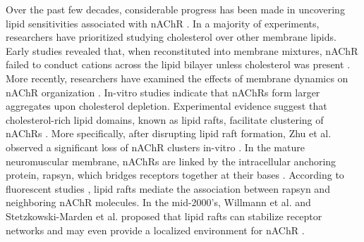 Over the past few decades, considerable progress has been made in uncovering lipid sensitivities associated with nAChR \citep{Criado1982}. In a majority of experiments, researchers have prioritized studying cholesterol over other membrane lipids. Early studies revealed that, when reconstituted into membrane mixtures, nAChR failed to conduct cations across the lipid bilayer unless cholesterol was present  \citep{Fong_Correlation_1986,Sunshine_Lipid_1992,Butler1993,Fong_Stabilization_1987,Corrie_Lipid_2002}. 
More recently, researchers have examined the effects of membrane dynamics on nAChR organization \citep{Baenziger2015,Bruses2001,Marchand2002a,Oshikawa2003,Pato2008,Zhu2006a,Baenziger2017,Barrantes2007,Barrantes2000,Bermudez2010,Barrantes2010,Perillo2016,Wenz2005,Borroni2016,Unwin2017}. In-vitro studies \citep{Barrantes2007,Barrantes2010} indicate that nAChRs form larger aggregates upon cholesterol depletion. Experimental evidence suggest that cholesterol-rich lipid domains, known as lipid rafts, facilitate clustering of nAChRs \citep{Campagna2006,Marchand2002a,Pato2008}. 
More specifically, after disrupting lipid raft formation, Zhu et al. observed a significant loss of nAChR clusters in-vitro \citep{Zhu2006a}. In the mature neuromuscular membrane, nAChRs are linked by the intracellular anchoring protein, rapsyn, which bridges receptors together at their bases  \citep{Zuber2013a}. According to fluorescent studies \citep{Marchand2002a}, lipid rafts mediate the association between rapsyn and neighboring nAChR molecules. In the mid-2000's, Willmann et al. and Stetzkowski-Marden et al. proposed that lipid rafts can stabilize receptor networks and may even provide a localized environment for nAChR \citep{Willmann2006,Stetzkowski-Marden2006}. 


